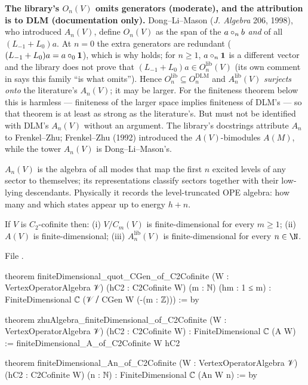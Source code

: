 \begin{warning}
\textbf{The library's $O_n(V)$ omits generators (moderate), and the attribution is to DLM (documentation only).} Dong--Li--Mason
(\emph{J. Algebra} 206, 1998), who introduced $A_n(V)$, define $O_n(V)$ as the span of the $a\circ_nb$
\emph{and} of all $(L_{-1}+L_0)a$. At $n = 0$ the extra generators are redundant ($(L_{-1}+L_0)a = a\circ_0\mathbf{1}$),
which is why  holds; for $n\ge1$, $a\circ_n\mathbf{1}$ is a different vector and the library does
not prove that $(L_{-1}+L_0)a\in O_n^{\mathrm{lib}}(V)$ (its own comment in
 says this family ``is what  omits'').
Hence $O_n^{\mathrm{lib}}\subseteq O_n^{\mathrm{DLM}}$ and $A_n^{\mathrm{lib}}(V)$ \emph{surjects onto} the literature's
$A_n(V)$; it may be larger. For the finiteness theorem below this is harmless --- finiteness of the larger space
implies finiteness of DLM's --- so that theorem is at least as strong as the literature's. But
 must not be identified with DLM's $A_n(V)$ without an argument. The library's docstrings attribute
$A_n$ to Frenkel--Zhu; Frenkel--Zhu (1992) introduced the $A(V)$-bimodules $A(M)$, while the tower $A_n(V)$ is
Dong--Li--Mason's.
\end{warning}

\begin{physics}
$A_n(V)$ is the algebra of all modes that map the first $n$ excited levels of any sector to themselves; its
representations classify sectors together with their low-lying descendants. Physically it records the
level-truncated OPE algebra: how many and which states appear up to energy $h+n$.
\end{physics}

\begin{theorem}\label{l12:thm:an}
If $V$ is $C_2$-cofinite then: (i) $V/C_m(V)$ is finite-dimensional for every $m\ge1$; (ii) $A(V)$ is
finite-dimensional; (iii) $A_n^{\mathrm{lib}}(V)$ is finite-dimensional for every $n\in\N$.
\end{theorem}
\noindent File .
\begin{leancode}
theorem finiteDimensional_quot_CGen_of_C2Cofinite (W : VertexOperatorAlgebra 𝒱)
    (hC2 : C2Cofinite W) (m : ℕ) (hm : 1 ≤ m) :
    FiniteDimensional ℂ (𝒱 ⧸ CGen W (-(m : ℤ))) := by

theorem zhuAlgebra_finiteDimensional_of_C2Cofinite (W : VertexOperatorAlgebra 𝒱)
    (hC2 : C2Cofinite W) : FiniteDimensional ℂ (A W) :=
  finiteDimensional_A_of_C2Cofinite W hC2

theorem finiteDimensional_An_of_C2Cofinite (W : VertexOperatorAlgebra 𝒱)
    (hC2 : C2Cofinite W) (n : ℕ) : FiniteDimensional ℂ (An W n) := by
\end{leancode}

